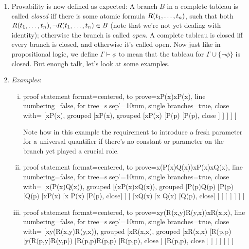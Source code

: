 \begin{enumerate}[\thesection.1]
	\item Provability is now defined as expected: A branch $B$ in a complete tableau is called \emph{closed} iff there is some atomic formula $R(t_1, \mathellipsis, t_n)$, such that  both $R(t_1, \mathellipsis, t_n),\neg R(t_1, \mathellipsis, t_n)\in B$ (note that we're not yet dealing with identity); otherwise the branch is called \emph{open}. A complete tableau is closed iff every branch is closed, and otherwise it's called open. Now just like in propositional logic, we define $\Gamma\vdash\phi$ to mean that the tableau for $\Gamma\cup\{\neg\phi\}$ is closed. But enough talk, let's look at some examples.
	
	\item \emph{Examples}:
	
		\begin{enumerate}[(i)]
		
		\item 			\begin{prooftree}
{
proof statement format={centered},
to prove={\forall xP(x)\vdash \exists xP(x)},
line numbering=false,
for tree={s sep'=10mm},
single branches=true,
close with=\xmark
}
[\forall xP(x), grouped 
	[\neg\exists xP(x), grouped
		[\forall x\neg P(x)
			[\neg P(p)
				[P(p), close
				]
			]
		]
	]
]
\end{prooftree}

Note how in this example the requirement to introduce a fresh parameter for a universal quantifier if there's no constant or parameter on the branch yet played a crucial role.
		
			\item 
			
			\begin{prooftree}
{
proof statement format={centered},
to prove={\exists x(P(x)\land Q(x))\vdash \exists xP(x)\land \exists xQ(x)},
line numbering=false,
for tree={s sep'=10mm},
single branches=true,
close with=\xmark
}
[\exists x(P(x)\land Q(x)), grouped 
	[\neg(\exists xP(x)\land \exists xQ(x)), grouped
		[P(p)\land Q(p)
			[P(p)
				[Q(p)
					[\neg\exists xP(x)
						[\forall x \neg P(x)
							[\neg P(p), close]	
						]
					]
					[\neg\exists xQ(x)
						[\forall x \neg Q(x)
							[\neg Q(p), close]
						]
					]
				]
			]
		]
	]
]
\end{prooftree}

	\item \begin{prooftree}
{
proof statement format={centered},
to prove={\forall x\forall y(R(x,y)\lor R(y,x))\vdash \forall xR(x,x)},
line numbering=false,
for tree={s sep'=10mm},
single branches=true,
close with=\xmark
}
[{\forall x\forall y(R(x,y)\lor R(y,x))}, grouped
	[{\neg \forall xR(x,x)}, grouped
		[{\exists x\neg R(x,x)} 
			[{\neg R(p,p)}
				[{\forall y(R(p,y)\lor R(y,p))}
					[{R(p,p)\lor R(p,p)}
						[{R(p,p)}, close ]
						[{R(p,p)}, close ]					
					]
				]
			]
		]
	]
]
\end{prooftree}


\end{enumerate}
\end{enumerate}
